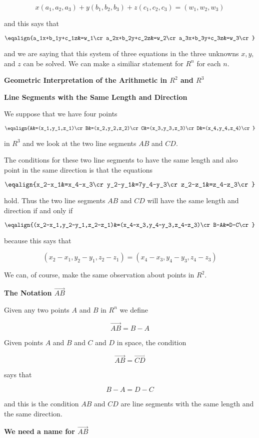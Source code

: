 $$x(a_1,a_2,a_3)+y(b_1,b_2,b_3)+z(c_1,c_2,c_3)=(w_1,w_2,w_3)$$

and this says that

$$\eqalign{a_1x+b_1y+c_1z&=w_1\cr
		a_2x+b_2y+c_2z&=w_2\cr
		a_3x+b_3y+c_3z&=w_3\cr}$$

and we are saying that this system of three equations in the three unknowns $x,y,$ and $z$ can be solved. We can make a similiar statement for $R^n$ for each $n$.

\filbreak
\vskip 1cm
{\bf Geometric Interpretation of the Arithmetic in $R^2$ and $R^3$}

\vskip 1cm
{\bf Line Segments with the Same Length and Direction}

\vskip 1mm
We suppose that we have four points

$$\eqalign{A&=(x_1,y_1,z_1)\cr
		B&=(x_2,y_2,z_2)\cr
		C&=(x_3,y_3,z_3)\cr
		D&=(x_4,y_4,z_4)\cr}$$

in $R^3$ and we look at the two line segments $AB$ and $CD$.

\vskip 1mm
The conditions for these two line segments to have the same length and also point in the same direction is that the equations

$$\eqalign{x_2-x_1&=x_4-x_3\cr
	y_2-y_1&=7y_4-y_3\cr
	z_2-z_1&=z_4-z_3\cr}$$

hold. Thus the two line segments $AB$ and $CD$ will have the same length and direction if and only if

$$\eqalign{(x_2-x_1,y_2-y_1,z_2-z_1)&=(x_4-x_3,y_4-y_3,z_4-z_3)\cr
		B-A&=D-C\cr}$$

because this says that 

$$(x_2-x_1,y_2-y_1,z_2-z_1)=(x_4-x_3,y_4-y_3,z_4-z_3)$$

We can, of course, make the same observation about points in $R^2$.

\filbreak
\vskip 1cm
{\bf The Notation $\vec{AB}$}

\vskip 1mm
Given any two points $A$ and $B$ in $R^n$ we define

$$\vec{AB}=B-A$$

Given points $A$ and $B$ and $C$ and $D$ in space, the condition

$$\vec{AB}=\vec{CD}$$

says that

$$B-A=D-C$$

and this is the condition $AB$ and $CD$ are line segments with the same length and the same direction.

\filbreak
\vskip 1cm
{\bf We need a name for $\vec{AB}$}

